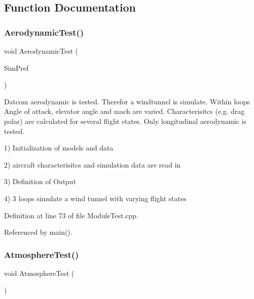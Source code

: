 \subsection{Function Documentation}
\mbox{\label{group___moduletest_gaa6c5f38a2905aa430098c2bbc54294ae}} 
\subsubsection{\texorpdfstring{Aerodynamic\+Test()}{AerodynamicTest()}}
{\footnotesize\ttfamily void Aerodynamic\+Test (\begin{DoxyParamCaption}\item[{Sim\+D\+Preference \&}]{Sim\+Pref }\end{DoxyParamCaption})}



Datcom aerodynamic is tested. Therefor a windtunnel is simulate. Within loops Angle of attack, elevator angle and mach are varied. Characterisitcs (e.\+g. drag polar) are calculated for several flight states. Only longitudinal aerodynamic is tested. 

1) Initialization of models and data

2) aircraft characterisitcs and simulation data are read in

3) Definition of Output

4) 3 loops simulate a wind tunnel with varying flight states 

Definition at line 73 of file Module\+Test.\+cpp.



Referenced by main().

\mbox{\label{group___moduletest_gad43a0024f4d65199da1e138730b77366}} 
\subsubsection{\texorpdfstring{Atmosphere\+Test()}{AtmosphereTest()}}
{\footnotesize\ttfamily void Atmosphere\+Test (\begin{DoxyParamCaption}{ }\end{DoxyParamCaption})}



